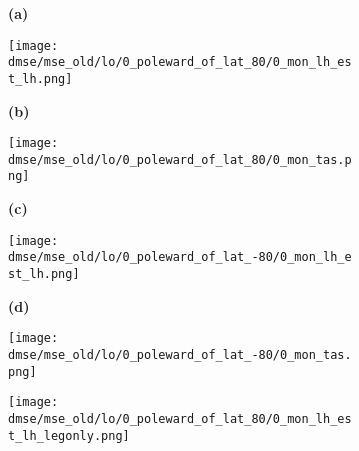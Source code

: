 \documentclass[preview]{standalone}
\begin{document}
\begin{figure}

  \begin{subfigure}[t]{0.05\textwidth}
    \textbf{\normalsize{(a)}}
  \end{subfigure}
  \begin{subfigure}[t]{0.45\textwidth}
    \texttt{[image: dmse/mse\_old/lo/0\_poleward\_of\_lat\_80/0\_mon\_lh\_est\_lh.png]}
  \end{subfigure}
  \begin{subfigure}[t]{0.05\textwidth}
    \textbf{\normalsize{(b)}}
  \end{subfigure}
  \begin{subfigure}[t]{0.45\textwidth}
    \texttt{[image: dmse/mse\_old/lo/0\_poleward\_of\_lat\_80/0\_mon\_tas.png]}
  \end{subfigure}

  \begin{subfigure}[t]{0.05\textwidth}
    \textbf{\normalsize{(c)}}
  \end{subfigure}
  \begin{subfigure}[t]{0.45\textwidth}
    \texttt{[image: dmse/mse\_old/lo/0\_poleward\_of\_lat\_-80/0\_mon\_lh\_est\_lh.png]}
  \end{subfigure}
  \begin{subfigure}[t]{0.05\textwidth}
    \textbf{\normalsize{(d)}}
  \end{subfigure}
  \begin{subfigure}[t]{0.45\textwidth}
    \texttt{[image: dmse/mse\_old/lo/0\_poleward\_of\_lat\_-80/0\_mon\_tas.png]}
  \end{subfigure}

  \begin{subfigure}[t]{0.05\textwidth}
    \hfill
  \end{subfigure}
  \begin{subfigure}[t]{0.45\textwidth}
    \texttt{[image: dmse/mse\_old/lo/0\_poleward\_of\_lat\_80/0\_mon\_lh\_est\_lh\_legonly.png]}
  \end{subfigure}


\end{figure}
\end{document}
